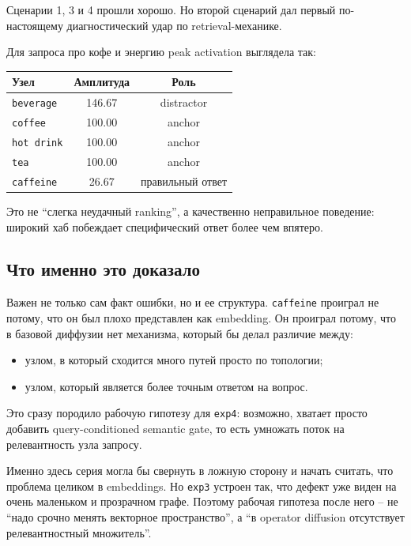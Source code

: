 Сценарии 1, 3 и 4 прошли хорошо. Но второй сценарий дал первый по-настоящему
диагностический удар по retrieval-механике.

Для запроса про кофе и энергию peak activation выглядела так:

\begin{center}
\begin{tabular}{lcc}
\toprule
Узел & Амплитуда & Роль \\
\midrule
\texttt{beverage} & 146.67 & distractor \\
\texttt{coffee} & 100.00 & anchor \\
\texttt{hot drink} & 100.00 & anchor \\
\texttt{tea} & 100.00 & anchor \\
\texttt{caffeine} & 26.67 & правильный ответ \\
\bottomrule
\end{tabular}
\end{center}

Это не ``слегка неудачный ranking'', а качественно неправильное поведение:
широкий хаб побеждает специфический ответ более чем впятеро.

\subsection{Что именно это доказало}

Важен не только сам факт ошибки, но и ее структура. \texttt{caffeine} проиграл
не потому, что он был плохо представлен как embedding. Он проиграл потому, что
в базовой диффузии нет механизма, который бы делал различие между:

\begin{itemize}[leftmargin=2em]
\item узлом, в который сходится много путей просто по топологии;
\item узлом, который является более точным ответом на вопрос.
\end{itemize}

Это сразу породило рабочую гипотезу для \texttt{exp4}: возможно, хватает просто
добавить query-conditioned semantic gate, то есть умножать поток на релевантность
узла запросу.

\begin{riskbox}
Именно здесь серия могла бы свернуть в ложную сторону и начать считать, что
проблема целиком в embeddings. Но \texttt{exp3} устроен так, что дефект уже виден
на очень маленьком и прозрачном графе. Поэтому рабочая гипотеза после него --
не ``надо срочно менять векторное пространство'', а ``в operator diffusion
отсутствует релевантностный множитель''.
\end{riskbox}


